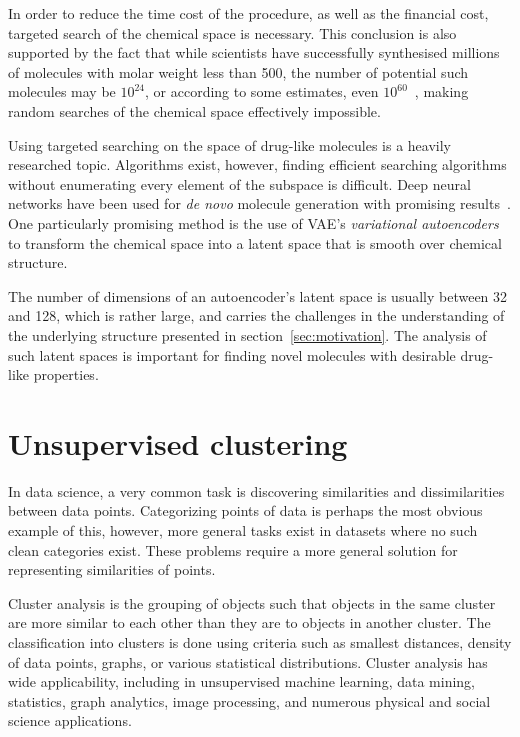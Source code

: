 In order to reduce the time cost of the procedure, as well as the financial cost, targeted search of the chemical space is necessary. This conclusion is also supported by the fact that while scientists have successfully synthesised millions of molecules with molar weight less than 500, the number of potential such molecules may be $10^{24}$, or according to some estimates, even $10^{60}$~\cite{bib:1060}, making random searches of the chemical space effectively impossible.

Using targeted searching on the space of drug-like molecules is a heavily researched topic. Algorithms exist, however, finding efficient searching algorithms without enumerating every element of the subspace is difficult. Deep neural networks have been used for \textit{de novo} molecule generation with promising results~\cite{bib:molsearch}. One particularly promising method is the use of VAE's \textit{variational autoencoders}~\cite{bib:vae} to transform the chemical space into a latent space that is smooth over chemical structure.

The number of dimensions of an autoencoder's latent space is usually between 32 and 128, which is rather large, and carries the challenges in the understanding of the underlying structure presented in section~\ref{sec:motivation}. The analysis of such latent spaces is important for finding novel molecules with desirable drug-like properties.

\section{Unsupervised clustering}\label{sec:unsupervised-clustering}

In data science, a very common task is discovering similarities and dissimilarities between data points. Categorizing points of data is perhaps the most obvious example of this, however, more general tasks exist in datasets where no such clean categories exist. These problems require a more general solution for representing similarities of points.

Cluster analysis is the grouping of objects such that objects in the same cluster are more similar to each other than they are to objects in another cluster. The classification into clusters is done using criteria such as smallest distances, density of data points, graphs, or various statistical distributions. Cluster analysis has  wide applicability, including in unsupervised machine learning, data mining, statistics, graph analytics,  image processing, and numerous physical and social science applications.

